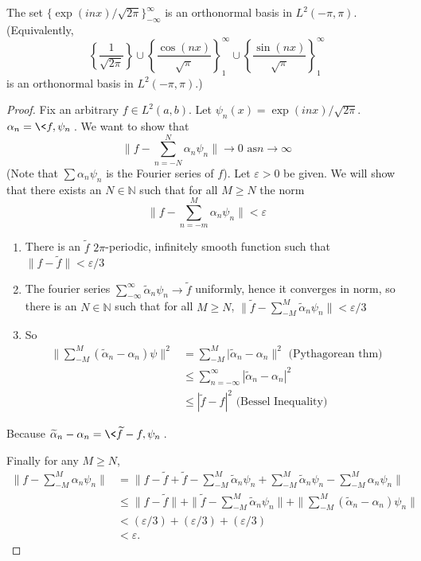 \begin{thm}
The set $\{\exp(inx)/\sqrt{2\pi}\}^{\infty}_{-\infty}$ is an
orthonormal basis in $L^{2}(-\pi,\pi)$. (Equivalently,
\begin{equation*}
\left\{\frac{1}{\sqrt{2\pi}}\right\}\cup\left\{\frac{\cos(nx)}{\sqrt{\pi}}\right\}^{\infty}_{1}\cup\left\{\frac{\sin(nx)}{\sqrt{\pi}}\right\}^{\infty}_{1}
\end{equation*}
is an orthonormal basis in $L^{2}(-\pi,\pi)$.)
\end{thm}

\begin{proof}
Fix an arbitrary $f\in L^{2}(a,b)$. Let $\psi_n(x) =
\exp(inx)/\sqrt{2\pi}$. $\alpha_n=\<f,\psi_n\>$. We want to
show that 
$$\|f-\sum^{N}_{n=-N}\alpha_{n}\psi_{n}\|\to0\text{ as
}n\to\infty$$
(Note that $\sum \alpha_n\psi_n$ is the Fourier series of
$f$).
Let $\varepsilon>0$ be given. We will show that there exists
an $N\in\mathbb{N}$ such that for all $M\geq N$ the norm
\begin{equation}
\|f-\sum^{M}_{n=-m}\alpha_n\psi_n\|<\varepsilon
\end{equation}
\begin{enumerate}
\item There is an $\widetilde{f}$ $2\pi$-periodic,
  infinitely smooth function such that
  $\|f-\widetilde{f}\|<\varepsilon/3$
\item The fourier series
  $\sum^{\infty}_{-\infty}\widetilde{\alpha}_n\psi_n\to\widetilde{f}$
  uniformly, hence it converges in norm, so there is an
  $N\in\mathbb{N}$ such that for all $M\geq N$,
  $\|\widetilde{f}-\sum^{M}_{-M}\widetilde{\alpha}_n\psi_n\|<\varepsilon/3$
\item So
\begin{align*}
\|\sum^{M}_{-M}(\widetilde{\alpha}_n-\alpha_n)\psi\|^2 &=
\sum^{M}_{-M}|\widetilde{\alpha}_n-\alpha_n\|^2\text{ (Pythagorean thm)}\\
&\leq\sum^{\infty}_{n=-\infty}|\widetilde{\alpha}_n-\alpha_n|^2\\
&\leq|\widetilde{f}-f|^2\text{ (Bessel Inequality)}
\end{align*}
\end{enumerate}
Because $\widetilde{\alpha}_n - \alpha_n = \<\widetilde{f}-f,\psi_{n}\>$.

Finally for any $M\geq N$,
\begin{align*}
\|f-\sum^{M}_{-M}\alpha_n\psi_n\| &= \|f-\widetilde{f}+\widetilde{f}-\sum^{M}_{-M}\widetilde{\alpha}_n\psi_n+\sum^{M}_{-M}\widetilde{\alpha}_n\psi_n-\sum^{M}_{-M}\alpha_n\psi_n\|\\
&\leq \|f-\widetilde{f}\| + \|\widetilde{f}-\sum^{M}_{-M}\widetilde{\alpha}_n\psi_n\|+\|\sum^{M}_{-M}(\widetilde{\alpha}_n-\alpha_n)\psi_n\|\\
&< (\varepsilon/3) + (\varepsilon/3) + (\varepsilon/3)\\
&< \varepsilon.
\end{align*}
\end{proof}

